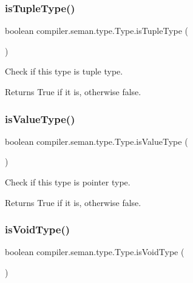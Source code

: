 \subsubsection{\texorpdfstring{is\+Tuple\+Type()}{isTupleType()}}
{\footnotesize\ttfamily boolean compiler.\+seman.\+type.\+Type.\+is\+Tuple\+Type (\begin{DoxyParamCaption}{ }\end{DoxyParamCaption})}

Check if this type is tuple type. \begin{DoxyReturn}{Returns}
True if it is, otherwise false. 
\end{DoxyReturn}
\mbox{\label{classcompiler_1_1seman_1_1type_1_1_type_a5de47f51f57b582dbc7b334bc3c87bd1}} 
\subsubsection{\texorpdfstring{is\+Value\+Type()}{isValueType()}}
{\footnotesize\ttfamily boolean compiler.\+seman.\+type.\+Type.\+is\+Value\+Type (\begin{DoxyParamCaption}{ }\end{DoxyParamCaption})}

Check if this type is pointer type. \begin{DoxyReturn}{Returns}
True if it is, otherwise false. 
\end{DoxyReturn}
\mbox{\label{classcompiler_1_1seman_1_1type_1_1_type_a768c5b1b9b54689a15723c556a0e0733}} 
\subsubsection{\texorpdfstring{is\+Void\+Type()}{isVoidType()}}
{\footnotesize\ttfamily boolean compiler.\+seman.\+type.\+Type.\+is\+Void\+Type (\begin{DoxyParamCaption}{ }\end{DoxyParamCaption})}

